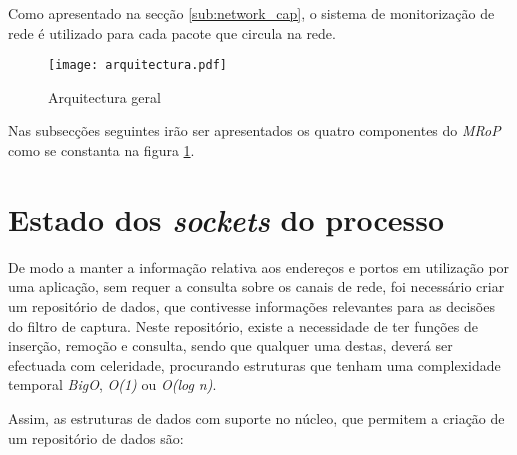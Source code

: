 Como apresentado na secção \ref{sub:network_cap}, o sistema de monitorização de rede é utilizado para cada pacote que circula na rede.

\begin{figure}[ht]
\centering
\texttt{[image: arquitectura.pdf]}
\caption{Arquitectura geral}
\label{fig:general_architecture}
\end{figure}







Nas subsecções seguintes irão ser apresentados os quatro componentes do \textit{MRoP} como se constanta na figura \ref{fig:general_architecture}.


\section{Estado dos \textit{sockets} do processo}

De modo a manter a informação relativa aos endereços e portos em utilização por uma aplicação, sem requer a consulta sobre os canais de rede, foi necessário criar um repositório de dados, que contivesse informações relevantes para as decisões do filtro de captura.
Neste repositório, existe a necessidade de ter funções de inserção, remoção e consulta, sendo que qualquer uma destas, deverá ser efectuada com celeridade, procurando estruturas que tenham uma complexidade temporal \textit{BigO}, \textit{O(1)} ou \textit{O(log n)}.

Assim, as estruturas de dados com suporte no núcleo, que permitem a criação de um repositório de dados são:


